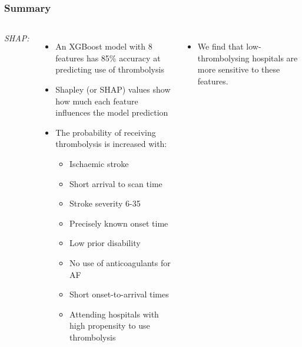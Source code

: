 \documentclass[xcolor={usenames,dvipsnames}]{beamer}
\begin{document}
\begin{frame}
\frametitle{Summary}

\begin{columns}
    \emph{SHAP:}
    \begin{itemize}
      \footnotesize 
      \item An XGBoost model with 8 features has 85\% accuracy at predicting use of thrombolysis
      \item Shapley (or SHAP) values show how much each feature influences the model prediction
      \item The probability of receiving thrombolysis is increased with:
      \begin{itemize}
        \tiny 
        \item Ischaemic stroke
        \item Short arrival to scan time
        \item Stroke severity 6-35
        \item Precisely known onset time
        \item Low prior disability
        \item No use of anticoagulants for AF
        \item Short onset-to-arrival times
        \item Attending hospitals with high propensity to use thrombolysis
      \end{itemize}
    \end{itemize}

    \begin{itemize}
      \footnotesize 
      \item We find that low-thrombolysing hospitals are 
      more sensitive to these features.
    \end{itemize}
    

\end{columns}
\end{frame}
\end{document}
